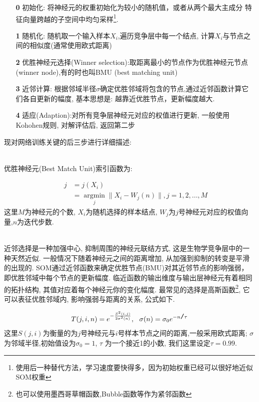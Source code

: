 \begin{itemize}
    \item[\textbf{0}] 初始化: 将神经元的权重初始化为较小的随机值，或者从两个最大主成分 特征向量跨越的子空间中均匀采样\footnote{使用后一种替代方法，学习速度要快得多，因为初始权重已经可以很好地近似SOM权重}.
    \item[\textbf{1}] 随机化: 随机取一个输入样本$X_i$,遍历竞争层中每一个结点, 计算$X_i$与节点之间的相似度(通常使用欧式距离)
    \item[\textbf{2}] 优胜神经元选择(Winner selection):取距离最小的节点作为优胜神经元节点 (winner node),有的时也叫BMU (best matching unit)
    \item[\textbf{3}] 近邻计算: 根据邻域半径$\sigma$确定优胜邻域将包含的节点,通过近邻函数计算它们各自更新的幅度, 基本思想是: 越靠近优胜节点，更新幅度越大.
    \item[\textbf{4}] 适应(Adaption):对所有竞争层神经元对应的权值进行更新, 一般使用Kohohen规则\cite{som}, 对解评估后, 返回第二步
\end{itemize}

现对网络训练关键的后三步进行详细描述:

\\

优胜神经元(Best Match Unit)索引函数为:

\begin{eqnarray}
  \quad &j &=j(X_i)\\
  \nonumber
  \quad& &=\mathop{argmin}\limits_j \|X_i - W_j(n)\|, j=1, 2,\dots ,M
\end{eqnarray}
这里$M$为神经元的个数, $X_i$为随机选择的样本结点, $W_j$为$j$号神经元对应的权值向量,$n$为迭代步数.

\\

近邻选择是一种加强中心, 抑制周围的神经元联结方式, 这是生物学竞争层中的一种天然近似. 一般情况下随着神经元之间的距离增加, 从加强到抑制的转变是平滑的出现的\cite{nnd2002}. SOM通过近邻函数来确定优胜节点(BMU)对其近邻节点的影响强弱，即优胜邻域中每个节点的更新幅度. 临近函数的输出维度与输出层神经元有着相同的拓扑结构, 其值对应着每个神经元你的变化幅度. 最常见的选择是高斯函数\footnote{也可以使用墨西哥草帽函数,Bubble函数等作为紧邻函数}, 它可以表征优胜邻域内, 影响强弱与距离的关系, 公式如下.

\begin{eqnarray}
  \quad & T(j,i,n) = e^{ - \frac{S^2(i,j)}{2\sigma^2(n)}},~~\sigma(n) = \sigma_0e^{- n  \verb|/| \tau}&
\end{eqnarray}
这里$S(j,i)$为衡量的为$j$号神经元与$i$号样本节点之间的距离,一般采用欧式距离; $\sigma$为邻域半径,初始值设为$\sigma_0 = 1$, $\tau$ 为一个接近1的小数, 我们这里设定$\tau = 0.99$.

